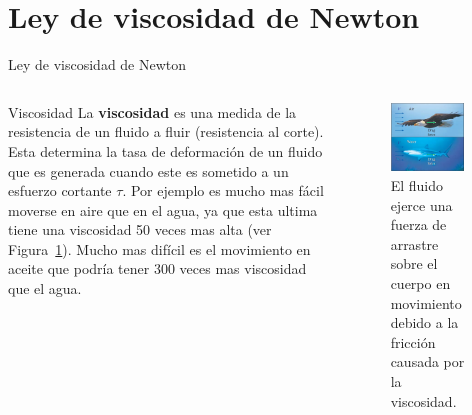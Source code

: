 \documentclass [xcolor=svgnames, t] {beamer}
\begin{document}
\section{Ley de viscosidad de Newton}
\begin{frame}{Ley de viscosidad de Newton}
\vspace{-0.5cm}
\begin{columns}
\begin{block}{Viscosidad}
La \textbf{viscosidad} es una medida de la resistencia de un fluido a fluir (resistencia al corte). Esta determina la tasa de deformaci\'on de un fluido que es generada cuando este es sometido a un esfuerzo cortante $\tau$. Por ejemplo es mucho mas f\'acil moverse en aire que en el agua, ya que esta ultima tiene una viscosidad 50 veces mas alta (ver Figura~\ref{visco0}). Mucho mas dif\'icil es el movimiento en aceite que podr\'ia tener 300 veces mas viscosidad que el agua. 
\end{block}
\begin{figure}[h]
\centering
\includegraphics[width=0.9\textwidth]{visco0}
\caption{El fluido ejerce una fuerza de arrastre sobre el cuerpo en movimiento debido a la fricci\'on causada por la viscosidad.}
\label{visco0}
\end{figure}
\end{columns}
\end{frame}
\end{document}
